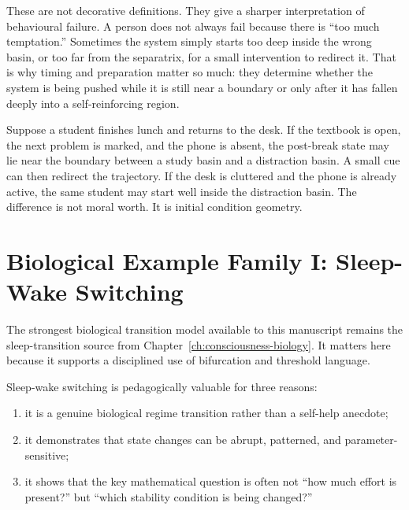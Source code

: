 \begin{discussion}
These are not decorative definitions. They give a sharper interpretation of
behavioural failure. A person does not always fail because there is ``too much
temptation.'' Sometimes the system simply starts too deep inside the wrong
basin, or too far from the separatrix, for a small intervention to redirect it.
That is why timing and preparation matter so much: they determine whether the
system is being pushed while it is still near a boundary or only after it has
fallen deeply into a self-reinforcing region.
\end{discussion}

\begin{example}
Suppose a student finishes lunch and returns to the desk. If the textbook is
open, the next problem is marked, and the phone is absent, the post-break state
may lie near the boundary between a study basin and a distraction basin. A
small cue can then redirect the trajectory. If the desk is cluttered and the
phone is already active, the same student may start well inside the distraction
basin. The difference is not moral worth. It is initial condition geometry.
\end{example}

\section{Biological Example Family I: Sleep-Wake Switching}

The strongest biological transition model available to this manuscript remains
the sleep-transition source from Chapter~\ref{ch:consciousness-biology}. It
matters here because it supports a disciplined use of bifurcation and threshold
language.

\begin{discussion}
Sleep-wake switching is pedagogically valuable for three reasons:
\begin{enumerate}[nosep]
  \item it is a genuine biological regime transition rather than a self-help
        anecdote;
  \item it demonstrates that state changes can be abrupt, patterned, and
        parameter-sensitive;
  \item it shows that the key mathematical question is often not ``how much
        effort is present?'' but ``which stability condition is being changed?''
\end{enumerate}
\end{discussion}

